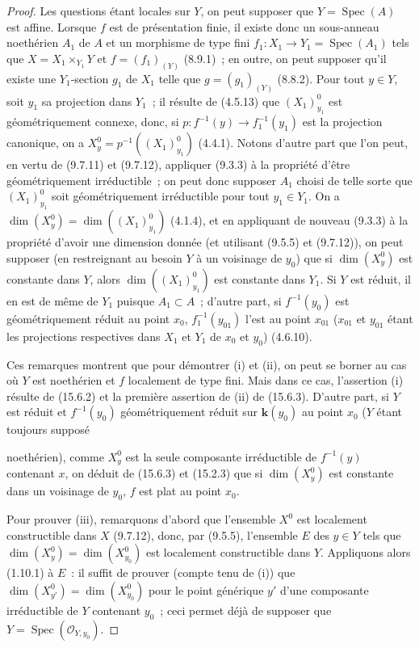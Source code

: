 \begin{proof}
Les questions étant locales sur $Y$, on peut supposer que $Y=\operatorname{Spec}(A)$ est affine. Lorsque $f$ est de présentation finie, il existe donc un sous-anneau noethérien $A_1$ de $A$ et un morphisme de type fini $f_1:X_1\to Y_1=\operatorname{Spec}(A_1)$ tels que $X=X_1\times_{Y_1}Y$ et $f=(f_1)_{(Y)}$ (8.9.1)~; en outre, on peut supposer qu'il existe une $Y_1$-section $g_1$ de $X_1$ telle que $g=(g_1)_{(Y)}$ (8.8.2). Pour tout $y\in Y$, soit $y_1$ sa projection dans $Y_1$~; il résulte de (4.5.13) que $(X_1)_{y_1}^0$ est géométriquement connexe, donc, si $p:f^{-1}(y)\to f_1^{-1}(y_1)$ est la projection canonique, on a $X_y^0=p^{-1}((X_1)_{y_1}^0)$ (4.4.1). Notons d'autre part que l'on peut, en vertu de (9.7.11) et (9.7.12), appliquer (9.3.3) à la propriété d'être géométriquement irréductible~; on peut donc supposer $A_1$ choisi de telle sorte que $(X_1)_{y_1}^0$ soit géométriquement irréductible pour tout $y_1\in Y_1$. On a $\dim(X_y^0)=\dim((X_1)_{y_1}^0)$ (4.1.4), et en appliquant de nouveau (9.3.3) à la propriété d'avoir une dimension donnée (et utilisant (9.5.5) et (9.7.12)), on peut supposer (en restreignant au besoin $Y$ à un voisinage de $y_0$) que si $\dim(X_y^0)$ est constante dans $Y$, alors $\dim((X_1)_{y_1}^0)$ est constante dans $Y_1$. Si $Y$ est réduit, il en est de même de $Y_1$ puisque $A_1\subset A$~; d'autre part, si $f^{-1}(y_0)$ est géométriquement réduit au point $x_0$, $f_1^{-1}(y_{01})$ l'est au point $x_{01}$ ($x_{01}$ et $y_{01}$ étant les projections respectives dans $X_1$ et $Y_1$ de $x_0$ et $y_0$) (4.6.10).

Ces remarques montrent que pour démontrer (i) et (ii), on peut se borner au cas où $Y$ est noethérien et $f$ localement de type fini. Mais dans ce cas, l'assertion (i) résulte de (15.6.2) et la première assertion de (ii) de (15.6.3). D'autre part, si $Y$ est réduit et $f^{-1}(y_0)$ géométriquement réduit sur $\mathbf{k}(y_0)$ au point $x_0$ ($Y$ étant toujours supposé

noethérien), comme $X_y^0$ est la seule composante irréductible de $f^{-1}(y)$ contenant $x$, on déduit de (15.6.3) et (15.2.3) que si $\dim(X_y^0)$ est constante dans un voisinage de $y_0$, $f$ est plat au point $x_0$.

Pour prouver (iii), remarquons d'abord que l'ensemble $X^0$ est localement constructible dans $X$ (9.7.12), donc, par (9.5.5), l'ensemble $E$ des $y\in Y$ tels que $\dim(X_y^0)=\dim(X_{y_0}^0)$ est localement constructible dans $Y$. Appliquons alors (1.10.1) à $E$~: il suffit de prouver (compte tenu de (i)) que $\dim(X_{y'}^0)=\dim(X_{y_0}^0)$ pour le point générique $y'$ d'une composante irréductible de $Y$ contenant $y_0$~; ceci permet déjà de supposer que $Y=\operatorname{Spec}(\mathcal O_{Y,y_0})$.


\end{proof}
